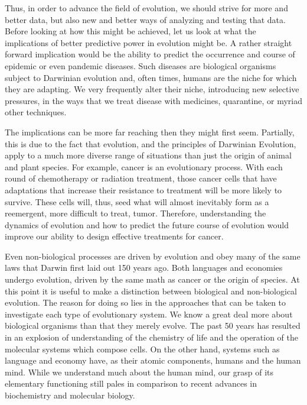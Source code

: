 Thus, in order to advance the field of evolution, we should strive for more and better data, but also new and better ways of analyzing and testing that data. Before looking at how this might be achieved, let us look at what the implications of better predictive power in evolution might be. A rather straight forward implication would be the ability to predict the occurrence and course of epidemic or even pandemic diseases. Such diseases are biological organisms subject to Darwinian evolution and, often times, humans are the niche for which they are adapting. We very frequently alter their niche, introducing new selective pressures, in the ways that we treat disease with medicines, quarantine, or myriad other techniques.

The implications can be more far reaching then they might first seem. Partially, this is due to the fact that evolution, and the principles of Darwinian Evolution, apply to a much more diverse range of situations than just the origin of animal and plant species. For example, cancer is an evolutionary process. With each round of chemotherapy or radiation treatment, those cancer cells that have adaptations that increase their resistance to treatment will be more likely to survive. These cells will, thus, seed what will almost inevitably form as a reemergent, more difficult to treat, tumor. Therefore, understanding the dynamics of evolution and how to predict the future course of evolution would improve our ability to design effective treatments for cancer.

Even non-biological processes are driven by evolution and obey many of the same laws that Darwin first laid out 150 years ago. Both languages and economies undergo evolution, driven by the same math as cancer or the origin of species. At this point it is useful to make a distinction between biological and non-biological evolution. The reason for doing so lies in the approaches that can be taken to investigate each type of evolutionary system. We know a great deal more about biological organisms than that they merely evolve. The past 50 years has resulted in an explosion of understanding of the chemistry of life and the operation of the molecular systems which compose cells. On the other hand, systems such as language and economy have, as their atomic components, humans and the human mind. While we understand much about the human mind, our grasp of its elementary functioning still pales in comparison to recent advances in biochemistry and molecular biology.

